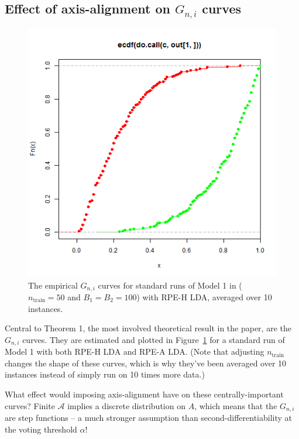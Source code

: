 \documentclass[ejs,preprint]{imsart}
\begin{document}
\subsection{Effect of axis-alignment on $G_{n,i}$ curves}

\begin{figure}
\begin{centering}
\includegraphics[scale=0.35]{G_ni}%
\par\end{centering}

\caption{The empirical $G_{n,i}$ curves for standard runs
of Model 1 in \cite{CS15} ($n_{\mathrm{train}}=50$ and $B_{1}=B_{2}=100$) with RPE-H LDA,
averaged over 10 instances.}

\label{fig:std-run-g-curves}
\end{figure}


Central to Theorem 1, the most involved theoretical result in the paper, are
the $G_{n,i}$ curves. They are estimated and plotted in Figure~\ref{fig:std-run-g-curves}
for a standard run of Model 1 with both RPE-H LDA and RPE-A LDA. (Note
that adjusting $n_{\mathrm{train}}$ changes the shape of these curves,
which is why they've been averaged over 10 instances instead of simply
run on 10 times more data.)

What effect would imposing axis-alignment have on these centrally-important curves? Finite $\mathcal{A}$ implies a discrete distribution on $A$, which means that the $G_{n,i}$
are step functions -- a much stronger assumption than second-differentiability
at the voting threshold $\alpha$!
\end{document}
